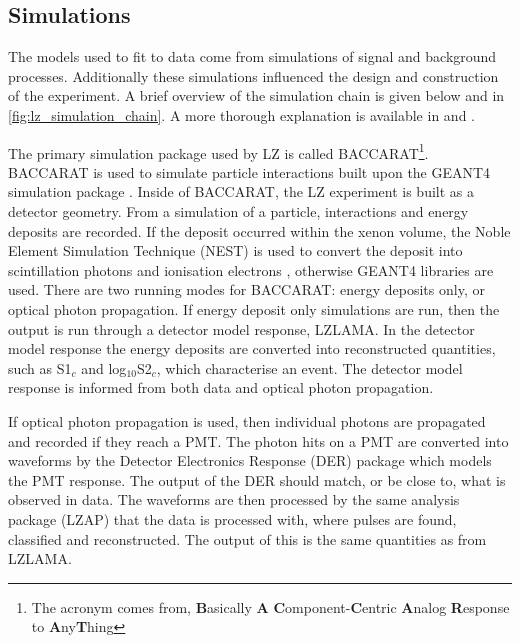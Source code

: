 \subsection{Simulations}
\label{sec:lz_simluations_chain}
\par
The models used to fit to data come from simulations of signal and background processes.
Additionally these simulations influenced the design and construction of the experiment.
A brief overview of the simulation chain is given below and in \autoref{fig:lz_simulation_chain}.
A more thorough explanation is available in \cite{lz_simulations_ref} and \cite{theresafruth_thesis_ref}.
\par
The primary simulation package used by LZ is called BACCARAT\footnote{The acronym comes from, \textbf{B}asically \textbf{A} \textbf{C}omponent-\textbf{C}entric \textbf{A}nalog \textbf{R}esponse to \textbf{A}ny\textbf{T}hing}.
BACCARAT is used to simulate particle interactions built upon the GEANT4 simulation package \cite{geant4_geometry_ref}.
Inside of BACCARAT, the LZ experiment is built as a detector geometry.
From a simulation of a particle, interactions and energy deposits are recorded.
If the deposit occurred within the xenon volume, the Noble Element Simulation Technique (NEST) is used to convert the deposit into scintillation photons and ionisation electrons \cite{nest_1_ref}, otherwise GEANT4 libraries are used.
There are two running modes for BACCARAT: energy deposits only, or optical photon propagation.
If energy deposit only simulations are run, then the output is run through a detector model response, LZLAMA.
In the detector model response the energy deposits are converted into reconstructed quantities, such as S1$_c$ and log$_{10}$S2$_c$, which characterise an event.
The detector model response is informed from both data and optical photon propagation.
\par
If optical photon propagation is used, then individual photons are propagated and recorded if they reach a PMT.
The photon hits on a PMT are converted into waveforms by the Detector Electronics Response (DER) package which models the PMT response.
The output of the DER should match, or be close to, what is observed in data.
The waveforms are then processed by the same analysis package (LZAP) that the data is processed with, where pulses are found, classified and reconstructed.
The output of this is the same quantities as from LZLAMA.



